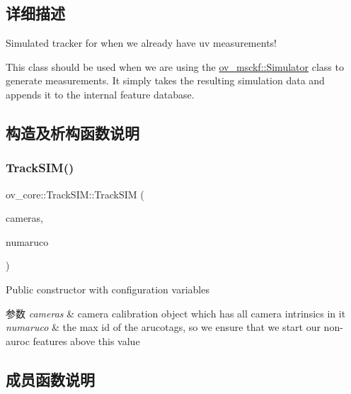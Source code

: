 \subsection{详细描述}
Simulated tracker for when we already have uv measurements! 

This class should be used when we are using the \hyperlink{classov__msckf_1_1Simulator}{ov\+\_\+msckf\+::\+Simulator} class to generate measurements. It simply takes the resulting simulation data and appends it to the internal feature database. 

\subsection{构造及析构函数说明}
\mbox{\label{classov__core_1_1TrackSIM_ac1b011188c7ec1af805b66bd5eaa29c8}} 
\subsubsection{\texorpdfstring{Track\+S\+I\+M()}{TrackSIM()}}
{\footnotesize\ttfamily ov\+\_\+core\+::\+Track\+S\+I\+M\+::\+Track\+S\+IM (\begin{DoxyParamCaption}\item[{std\+::unordered\+\_\+map$<$ size\+\_\+t, std\+::shared\+\_\+ptr$<$ \hyperlink{classov__core_1_1CamBase}{Cam\+Base} $>$$>$}]{cameras,  }\item[{int}]{numaruco }\end{DoxyParamCaption})\hspace{0.3cm}{\ttfamily [inline]}}



Public constructor with configuration variables 


\begin{DoxyParams}{参数}
{\em cameras} & camera calibration object which has all camera intrinsics in it \\
\hline
{\em numaruco} & the max id of the arucotags, so we ensure that we start our non-\/auroc features above this value \\
\hline
\end{DoxyParams}


\subsection{成员函数说明}
\mbox{\label{classov__core_1_1TrackSIM_a00388c410c804854c4c91e1a392d44e0}} 
